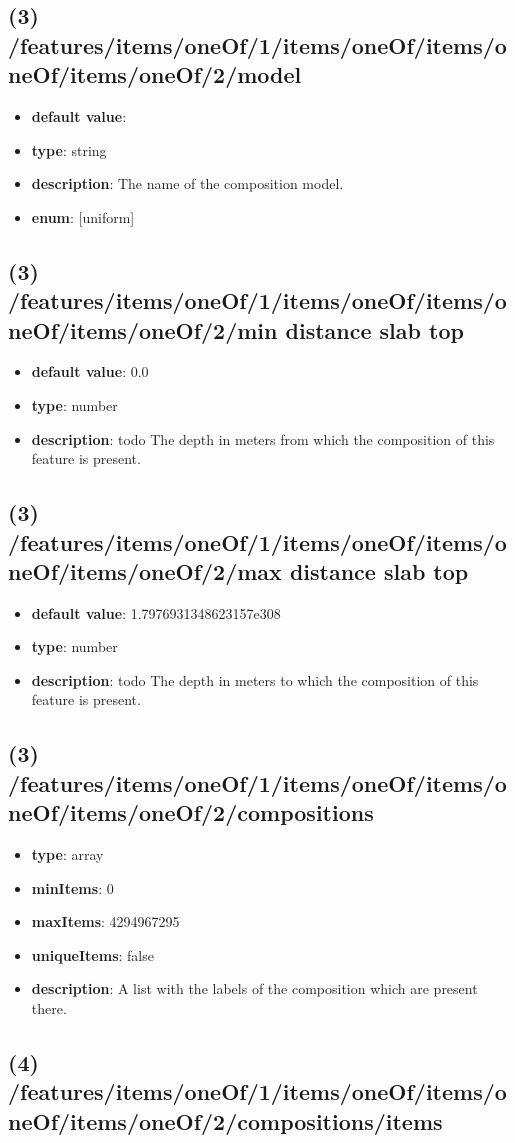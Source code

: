 \subsection{(3) /features/items/oneOf/1/items/oneOf/items/oneOf/items/oneOf/2/model}
\begin{itemize}[leftmargin=3em]\item {\bf default value}: 
\item {\bf type}: string
\item {\bf description}: The name of the composition model.
\item {\bf enum}: [uniform]\end{itemize}\subsection{(3) /features/items/oneOf/1/items/oneOf/items/oneOf/items/oneOf/2/min distance slab top}
\begin{itemize}[leftmargin=3em]\item {\bf default value}: 0.0
\item {\bf type}: number
\item {\bf description}: todo The depth in meters from which the composition of this feature is present.
\end{itemize}\subsection{(3) /features/items/oneOf/1/items/oneOf/items/oneOf/items/oneOf/2/max distance slab top}
\begin{itemize}[leftmargin=3em]\item {\bf default value}: 1.7976931348623157e308
\item {\bf type}: number
\item {\bf description}: todo The depth in meters to which the composition of this feature is present.
\end{itemize}\subsection{(3) /features/items/oneOf/1/items/oneOf/items/oneOf/items/oneOf/2/compositions}
\begin{itemize}[leftmargin=3em]\item {\bf type}: array
\item {\bf minItems}: 0
\item {\bf maxItems}: 4294967295
\item {\bf uniqueItems}: false
\item {\bf description}: A list with the labels of the composition which are present there.
\end{itemize}\subsection{(4) /features/items/oneOf/1/items/oneOf/items/oneOf/items/oneOf/2/compositions/items}

